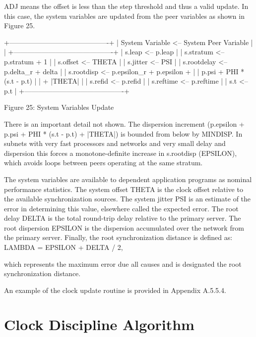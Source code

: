 ADJ means the offset is less than the step threshold and thus a valid
update.  In this case, the system variables are updated from the peer
variables as shown in Figure 25.

              +-------------------------------------------+
              | System Variable <-- System Peer Variable  |        |
              +-------------------------------------------+
              | s.leap      <-- p.leap                    |
              | s.stratum   <-- p.stratum + 1             |
              | s.offset    <-- THETA                     |
              | s.jitter    <-- PSI                       |
              | s.rootdelay <-- p.delta\_r + delta         |
              | s.rootdisp  <-- p.epsilon\_r + p.epsilon + |
              |                 p.psi + PHI * (s.t - p.t) |
              |                 + |THETA|                 |
              | s.refid     <-- p.refid                   |
              | s.reftime   <-- p.reftime                 |
              | s.t         <-- p.t                       |
              +-------------------------------------------+

                Figure 25: System Variables Update

There is an important detail not shown.  The dispersion increment
(p.epsilon + p.psi + PHI * (s.t - p.t) + |THETA|) is bounded from
below by MINDISP.  In subnets with very fast processors and networks
and very small delay and dispersion this forces a monotone-definite
increase in s.rootdisp (EPSILON), which avoids loops between peers
operating at the same stratum.

The system variables are available to dependent application programs
as nominal performance statistics.  The system offset THETA is the
clock offset relative to the available synchronization sources.  The
system jitter PSI is an estimate of the error in determining this
value, elsewhere called the expected error.  The root delay DELTA is
the total round-trip delay relative to the primary server.  The root
dispersion EPSILON is the dispersion accumulated over the network
from the primary server.  Finally, the root synchronization distance
is defined as:
LAMBDA = EPSILON + DELTA / 2,

which represents the maximum error due all causes and is designated
the root synchronization distance.

An example of the clock update routine is provided in
Appendix A.5.5.4.

\section{Clock Discipline Algorithm}

